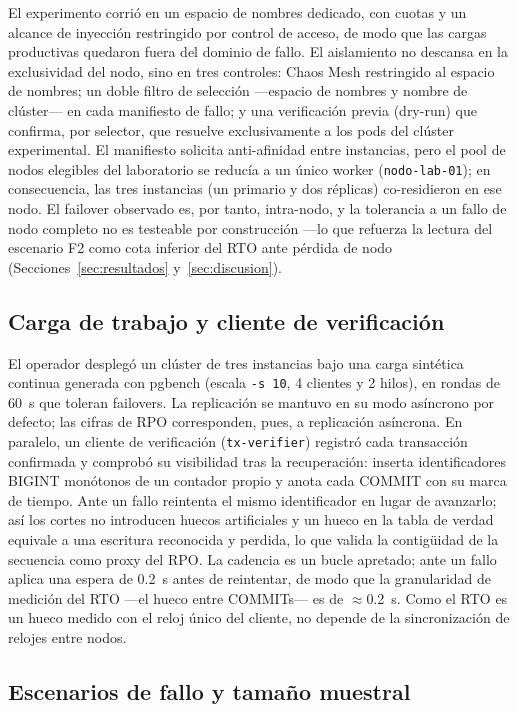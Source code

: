 \documentclass[a4paper]{llncs}
\begin{document}
El experimento corrió en un espacio de nombres dedicado, con cuotas y un alcance
de inyección restringido por control de acceso, de modo que las cargas
productivas quedaron fuera del dominio de fallo. El aislamiento no descansa en la
exclusividad del nodo, sino en tres controles: Chaos Mesh restringido al espacio
de nombres; un doble filtro de selección ---espacio de nombres y nombre de
clúster--- en cada manifiesto de fallo; y una verificación previa (dry-run) que
confirma, por selector, que resuelve exclusivamente a los pods del clúster
experimental. El manifiesto solicita anti-afinidad entre instancias, pero el pool
de nodos elegibles del laboratorio se reducía a un único worker
(\texttt{nodo-lab-01}); en consecuencia, las tres instancias (un primario y dos
réplicas) co-residieron en ese nodo. El failover observado es, por tanto,
intra-nodo, y la tolerancia a un fallo de nodo completo no es testeable por
construcción ---lo que refuerza la lectura del escenario F2 como cota inferior del
RTO ante pérdida de nodo (Secciones~\ref{sec:resultados}
y~\ref{sec:discusion}).

\subsection{Carga de trabajo y cliente de verificación}

El operador desplegó un clúster de tres instancias bajo una carga sintética
continua generada con pgbench (escala \texttt{-s 10}, 4 clientes y 2 hilos), en
rondas de 60~s que toleran failovers. La replicación se mantuvo en su modo
asíncrono por defecto; las cifras de RPO corresponden, pues, a replicación
asíncrona. En paralelo, un cliente de verificación (\texttt{tx-verifier})
registró cada transacción confirmada y comprobó su visibilidad tras la
recuperación: inserta identificadores BIGINT monótonos de un contador propio y
anota cada COMMIT con su marca de tiempo. Ante un fallo reintenta el mismo
identificador en lugar de avanzarlo; así los cortes no introducen huecos
artificiales y un hueco en la tabla de verdad equivale a una escritura reconocida
y perdida, lo que valida la contigüidad de la secuencia como proxy del RPO. La
cadencia es un bucle apretado; ante un fallo aplica una espera de 0.2~s antes de
reintentar, de modo que la granularidad de medición del RTO ---el hueco entre
COMMITs--- es de $\approx$0.2~s. Como el RTO es un hueco medido con el reloj único
del cliente, no depende de la sincronización de relojes entre nodos.

\subsection{Escenarios de fallo y tamaño muestral}
\end{document}
